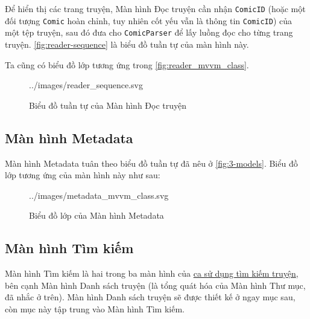 \documentclass[../../../../thesis]{subfiles}
\begin{document}
Để hiển thị các trang truyện, Màn hình Đọc truyện cần nhận \texttt{ComicID}
(hoặc một đối tượng \texttt{Comic} hoàn chỉnh, tuy nhiên cốt yếu vẫn là thông
tin \texttt{ComicID}) của một tệp truyện, sau đó đưa cho \texttt{ComicParser} để
lấy luồng đọc cho từng trang truyện. \autoref{fig:reader-sequence} là biểu đồ
tuần tự của màn hình này.

Ta cũng có biểu đồ lớp tương ứng trong \autoref{fig:reader_mvvm_class}.

\begin{figure}[H]
    \centering
    
        {../images/reader_sequence.svg}
    \caption{Biểu đồ tuần tự của Màn hình Đọc truyện}
    \label{fig:reader-sequence}
\end{figure}



\subsection{Màn hình Metadata}\label{sec:metadata-design}

Màn hình Metadata tuân theo biểu đồ tuần tự đã nêu ở \autoref{fig:3-models}.
Biểu đồ lớp tương ứng của màn hình này như sau:

\begin{figure}[H]
    \centering
    
        {../images/metadata_mvvm_class.svg}
    \caption{Biểu đồ lớp của Màn hình Metadata}
    \label{fig:metadata_mvvm_class}
\end{figure}



\subsection{Màn hình Tìm kiếm}\label{sec:search-design}

Màn hình Tìm kiếm là hai trong ba màn hình của \hyperref[sec:search-comic]{ca sử
dụng tìm kiếm truyện}, bên cạnh Màn hình Danh sách truyện (là tổng quát hóa của
Màn hình Thư mục, đã nhắc ở trên). Màn hình Danh sách truyện sẽ được thiết kế ở
ngay mục sau, còn mục này tập trung vào Màn hình Tìm kiếm.
\end{document}
